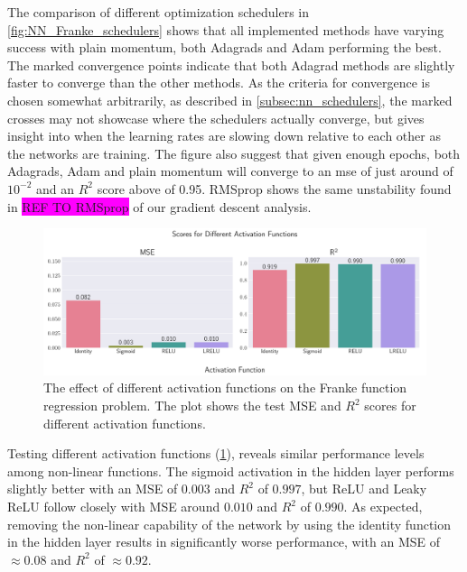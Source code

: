 The comparison of different optimization schedulers in \cref{fig:NN_Franke_schedulers} shows that all implemented methods have varying success with plain momentum, both Adagrads and Adam performing the best. The marked convergence points indicate that both Adagrad methods are slightly faster to converge than the other methods. As the criteria for convergence is chosen somewhat arbitrarily, as described in \cref{subsec:nn_schedulers}, the marked crosses may not showcase where the schedulers actually converge, but gives insight into when the learning rates are slowing down relative to each other as the networks are training. The figure also suggest that given enough epochs, both Adagrads, Adam and plain momentum will converge to an mse of just around of \( 10^{-2} \) and an \( R^2 \) score above of 0.95. RMSprop shows the same unstability found in \colorbox{magenta}{REF TO RMSprop} of our gradient descent analysis.

\clearpage

\onecolumngrid
\begin{figure}[h!]
    \begin{minipage}{\textwidth}
        \centering
        \includegraphics[width = .9\textwidth]{../figs/c_activation_funcs.pdf}
        \caption{The effect of different activation functions on the Franke function regression problem. The plot shows the test MSE and \( R^2 \) scores for different activation functions.}
        \label{fig:NN_Franke_activation}
    \end{minipage}
\end{figure}
\twocolumngrid

Testing different activation functions (\cref{fig:NN_Franke_activation}), reveals similar performance levels among non-linear functions. The sigmoid activation in the hidden layer performs slightly better with an MSE of $0.003$ and $R^2$ of $0.997$, but ReLU and Leaky ReLU follow closely with MSE around $0.010$ and $R^2$ of $0.990$. As expected, removing the non-linear capability of the network by using the identity function in the hidden layer results in significantly worse performance, with an MSE of $\approx0.08$ and $R^2$ of $\approx0.92$.

